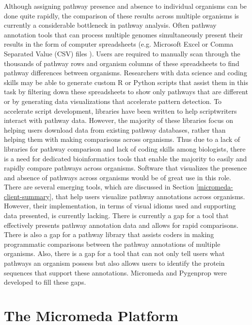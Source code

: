 Although assigning pathway presence and absence to individual organisms can be done quite rapidly, the comparison of these results across multiple organisms is currently a considerable bottleneck in pathway analysis. Often pathway annotation tools that can process multiple genomes simultaneously present their results in the form of computer spreadsheets (e.g. Microsoft Excel or Comma Separated Value (CSV) files \cite{RFC4180}). Users are required to manually scan through the thousands of pathway rows and organism columns of these spreadsheets to find pathway differences between organisms. Researchers with data science and coding skills may be able to generate custom R or Python scripts that assist them in this task by filtering down these spreadsheets to show only pathways that are different or by generating data visualizations that accelerate pattern detection. To accelerate script development, libraries have been written to help scriptwriters interact with pathway data. However, the majority of these libraries focus on helping users download data from existing pathway databases, rather than helping them with making comparisons across organisms. Thus due to a lack of libraries for pathway comparison and lack of coding skills among biologists, there is a need for dedicated bioinformatics tools that enable the majority to easily and rapidly compare pathways across organisms. Software that visualizes the presence and absence of pathways across organisms would be of great use in this role. There are several emerging tools, which are discussed in Section \ref{micromeda-client-summary}, that help users visualize pathway annotations across organisms. However, their implementation, in terms of visual idioms used and supporting data presented, is currently lacking. There is currently a gap for a tool that effectively presents pathway annotation data and allows for rapid comparisons. There is also a gap for a pathway library that assists coders in making programmatic comparisons between the pathway annotations of multiple organisms. Also, there is a gap for a tool that can not only tell users what pathways an organism possess but also allows users to identify the protein sequences that support these annotations. Micromeda and Pygenprop were developed to fill these gaps.

\section{The Micromeda Platform} \label{micromeda-overview}

